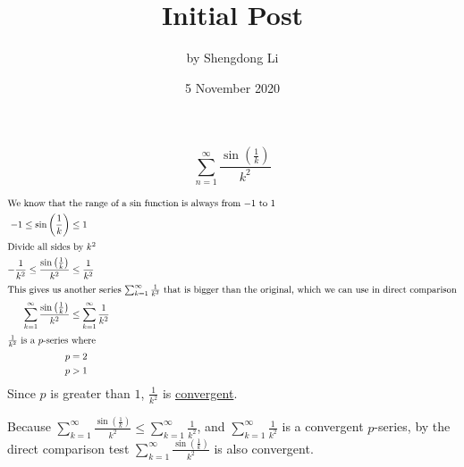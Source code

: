 \documentclass[12pt]{article}
\begin{document}
\title{Initial Post}
\author{by Shengdong Li}
\date{5 November 2020}
\maketitle

$$
  \sum_{n=1}^{\infty} \frac{\sin\left(\frac{1}{k}\right)}{k^{2}}
$$

\begin{align}
  \intertext{We know that the range of a $\sin$ function is always from $-1$ to $1$}
  -1\le\sin\left(\frac{1}{k}\right)                             & \le1                                  \\
  \intertext{Divide all sides by $k^{2}$}
  -\frac{1}{k^{2}}\le\frac{\sin\left(\frac{1}{k}\right)}{k^{2}} & \le\frac{1}{k^{2}}                    \\
  \intertext{This gives us another series $\sum_{k=1}^{\infty}\frac{1}{k^{2}}$ that is bigger than the original, which we can use in direct comparison}
  \sum_{k=1}^{\infty}\frac{\sin\left(\frac{1}{k}\right)}{k^{2}} & \le\sum_{k=1}^{\infty}\frac{1}{k^{2}} \\
  \intertext{$\frac{1}{k^{2}}$ is a $p$-series where}
  p                                                             & =2                                    \\
  p                                                             & >1
\end{align}
Since $p$ is greater than $1$, $\frac{1}{k^{2}}$ is \underline{convergent}.

Because $\sum_{k=1}^{\infty}\frac{\sin\left(\frac{1}{k}\right)}{k^{2}}\le\sum_{k=1}^{\infty}\frac{1}{k^{2}}$, and $\sum_{k=1}^{\infty}\frac{1}{k^{2}}$ is a convergent $p$-series, by the direct comparison test $\sum_{k=1}^{\infty}\frac{\sin\left(\frac{1}{k}\right)}{k^{2}}$ is also convergent.
\end{document}
